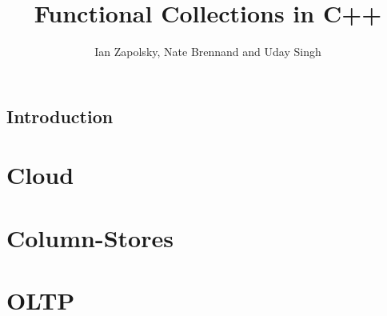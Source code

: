 \documentclass[11pt]{article}
\author{Ian Zapolsky, Nate Brennand and Uday Singh}
\title{Functional Collections in C++}
\begin{document}
\setlength{\parskip}{.1 in}

\maketitle
\newpage

\subsection*{Introduction}

%
%

\section*{Cloud}

\section*{Column-Stores}

\section*{OLTP}


\end{document}
